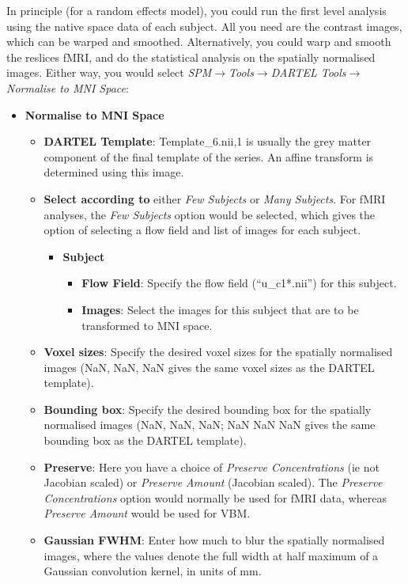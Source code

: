 In principle (for a random effects model), you could run the first level analysis using the native space data of each subject.
All you need are the contrast images, which can be warped and smoothed.
Alternatively, you could warp and smooth the reslices fMRI, and do the statistical analysis on the spatially normalised images.
Either way, you would select \emph{SPM$\rightarrow$Tools$\rightarrow$DARTEL Tools$\rightarrow$Normalise to MNI Space}:
\begin{itemize}
\item{{\bf Normalise to MNI Space}
    \begin{itemize}
    \item{{\bf DARTEL Template}: Template\_6.nii,1 is usually the grey matter component of the final template of the series.  An affine transform is determined using this image.}
    \item{{\bf Select according to} either \emph{Few Subjects} or \emph{Many Subjects}.  For fMRI analyses, the \emph{Few Subjects} option would be selected, which gives the option of selecting a flow field and list of images for each subject.
      \begin{itemize}
      \item{{\bf Subject}
        \begin{itemize}
        \item{{\bf Flow Field}: Specify the flow field (``u\_c1*.nii'') for this subject.}
        \item{{\bf Images}: Select the images for this subject that are to be transformed to MNI space.}
        \end{itemize}
      }
      \end{itemize}
    }
    \item{{\bf Voxel sizes}: Specify the desired voxel sizes for the spatially normalised images (NaN, NaN, NaN gives the same voxel sizes as the DARTEL template).}
    \item{{\bf Bounding box}: Specify the desired bounding box for the spatially normalised images (NaN, NaN, NaN; NaN NaN NaN gives the same bounding box as the DARTEL template).}
    \item{{\bf Preserve}: Here you have a choice of \emph{Preserve Concentrations} (ie not Jacobian scaled) or \emph{Preserve Amount} (Jacobian scaled).  The \emph{Preserve Concentrations} option would normally be used for fMRI data, whereas \emph{Preserve Amount} would be used for VBM.}
    \item{{\bf Gaussian FWHM}: Enter how much to blur the spatially normalised images, where the values denote the full width at half maximum of a Gaussian convolution kernel, in units of mm.}
    \end{itemize}
}
\end{itemize}

